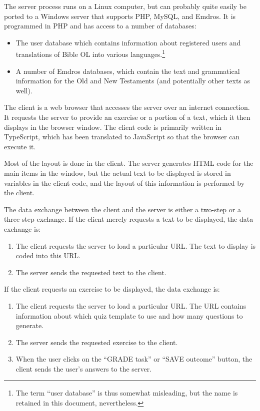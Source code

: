 \documentclass[11pt,oneside,a4paper]{memoir}
\begin{document}
The server process runs on a Linux computer, but can probably quite easily be ported to a Windows server
that supports PHP, MySQL, and Emdros. It is programmed in PHP and has access to a number of
databases:

\begin{itemize}
\item The user database which contains information about registered users and
  translations of Bible OL into various languages.\footnote{The term ``user database'' is thus
    somewhat misleading, but the name is retained in this document, nevertheless.}
\item A number of Emdros databases, which contain the text and grammatical information for the Old
  and New Testaments (and potentially other texts as well).
\end{itemize}

The client is a web browser that accesses the server over an
internet connection. It requests the server to provide an exercise or a portion of a text, which it
then displays in the browser window. The client code is primarily written in
TypeScript, which has been translated to JavaScript so that the
browser can execute it.

Most of the layout is done in the client. The server generates HTML code for the main items in the
window, but the actual text to be displayed is stored in variables in the client code, and the layout of
this information is performed by the client.

The data exchange between the client and the server is either a two-step or a three-step exchange.
If the client merely requests a text to be displayed, the data exchange is:

\begin{enumerate}
\item The client requests the server to load a particular URL. The text to display is coded into
  this URL.
\item The server sends the requested text to the client.
\end{enumerate}

If the client requests an exercise to be displayed, the data exchange is:

\begin{enumerate}
\item The client requests the server to load a particular URL. The URL contains information about which
  quiz template to use and how many questions to generate.
\item The server sends the requested exercise to the client.
\item When the user clicks on the ``GRADE task'' or ``SAVE
  outcome'' button, the client sends the user's
  answers to the server.
\end{enumerate}
\end{document}
